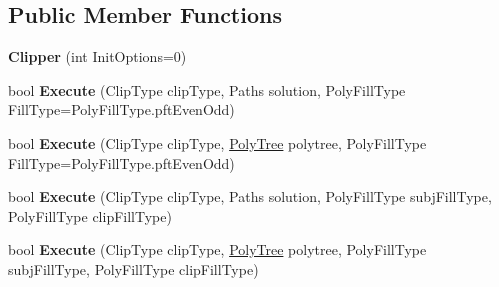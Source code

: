 \subsection*{Public Member Functions}
\begin{DoxyCompactItemize}
\item 
\mbox{\label{class_super_tiled2_unity_1_1_editor_1_1_clipper_lib_1_1_clipper_a3f1869d343501932f89c055422863dc3}} 
{\bfseries Clipper} (int Init\+Options=0)
\item 
\mbox{\label{class_super_tiled2_unity_1_1_editor_1_1_clipper_lib_1_1_clipper_a683b0bfd01a805684804ee4b487231c9}} 
bool {\bfseries Execute} (Clip\+Type clip\+Type, Paths solution, Poly\+Fill\+Type Fill\+Type=Poly\+Fill\+Type.\+pft\+Even\+Odd)
\item 
\mbox{\label{class_super_tiled2_unity_1_1_editor_1_1_clipper_lib_1_1_clipper_a9719ca2d75dafd34f46e6c9be24dfa0c}} 
bool {\bfseries Execute} (Clip\+Type clip\+Type, \mbox{\hyperlink{class_super_tiled2_unity_1_1_editor_1_1_clipper_lib_1_1_poly_tree}{Poly\+Tree}} polytree, Poly\+Fill\+Type Fill\+Type=Poly\+Fill\+Type.\+pft\+Even\+Odd)
\item 
\mbox{\label{class_super_tiled2_unity_1_1_editor_1_1_clipper_lib_1_1_clipper_a879e9c4301d7388ed3cab3b7edd30b1e}} 
bool {\bfseries Execute} (Clip\+Type clip\+Type, Paths solution, Poly\+Fill\+Type subj\+Fill\+Type, Poly\+Fill\+Type clip\+Fill\+Type)
\item 
\mbox{\label{class_super_tiled2_unity_1_1_editor_1_1_clipper_lib_1_1_clipper_a834c4cfd88ab65814ae55922e57f8de4}} 
bool {\bfseries Execute} (Clip\+Type clip\+Type, \mbox{\hyperlink{class_super_tiled2_unity_1_1_editor_1_1_clipper_lib_1_1_poly_tree}{Poly\+Tree}} polytree, Poly\+Fill\+Type subj\+Fill\+Type, Poly\+Fill\+Type clip\+Fill\+Type)
\end{DoxyCompactItemize}
